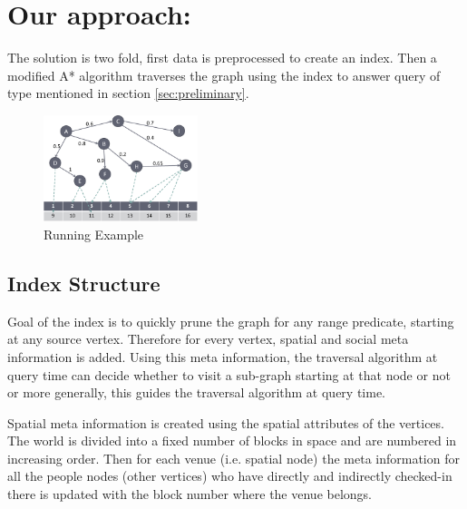 \section{Our approach: {\rrp}} \label{sec:solution}

The solution is two fold, first data is preprocessed to create an index. Then a modified A* algorithm traverses the graph using the index to answer query of type mentioned in section \ref{sec:preliminary}.


\begin{figure}[t]
	\centering \includegraphics[width=0.40\textwidth]{images/space_partitioned_world.eps}
    \caption{Running Example}
    \label{fig:running-example-solution}
\end{figure}

\subsection{Index Structure}
Goal of the index is to quickly prune the graph for any range predicate, starting at any source vertex. Therefore for every vertex, spatial and social meta information is added. Using this meta information, the traversal algorithm at query time can decide whether to visit a sub-graph starting at that node or not or more generally, this guides the traversal algorithm at query time.

Spatial meta information is created using the spatial attributes of the vertices. The world is divided into a fixed number of blocks in space and are numbered in increasing order. Then for each venue (i.e. spatial node) the meta information for all the people nodes (other vertices) who have directly and indirectly checked-in there is updated with the block number where the venue belongs. 

